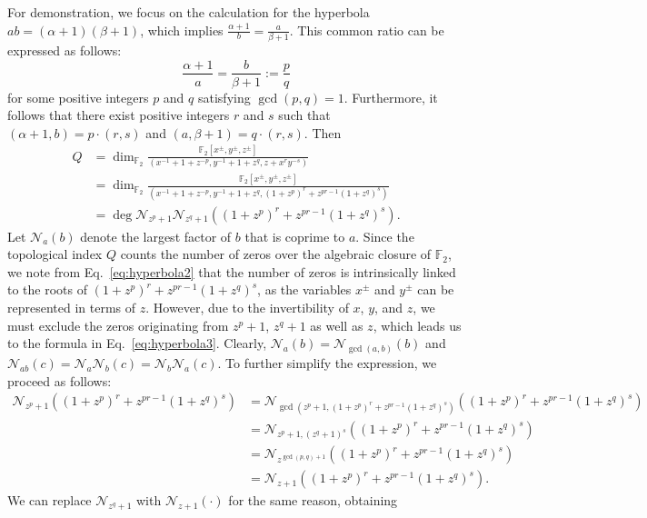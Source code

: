 \documentclass[aps,prl,english,superscriptaddress,twocolumn,tightenlines,showpacs,longbibliography,floatfix,amsfonts]{revtex4-2}
\begin{document}
For demonstration, we focus on the calculation for the hyperbola $ab=(\alpha+1)(\beta+1)$, which implies $\frac{\alpha+1}{b} = \frac{a}{\beta+1}$. This common ratio can be expressed as follows: 
\begin{equation}
	\frac{\alpha+1}{a} = \frac{b}{\beta+1} := \frac{p}{q}
\end{equation}
for some positive integers $p$ and $q$ satisfying $\gcd(p,q) = 1$. Furthermore, it follows that there exist positive integers $r$ and $s$ such that $(\alpha+1,b)=p\cdot(r,s)$ and $(a, \beta+1)=q\cdot(r,s)$. Then
\begin{align}
	Q &= \dim_{\mathbb{F}_2}\frac{\mathbb{F}_2[x^{\pm}, y^{\pm}, z^{\pm}]}{\left(x^{-1}+1+z^{-p}, y^{-1}+1+z^q, z+x^ry^{-s}\right)} \\
	&= \dim_{\mathbb{F}_2}\frac{\mathbb{F}_2[x^{\pm}, y^{\pm}, z^{\pm}]}{\left(x^{-1}+1+z^{-p}, y^{-1}+1+z^q, (1+z^p)^r+z^{pr-1}(1+z^q)^s\right)}\label{eq:hyperbola2} \\
	&= \deg \mathcal{N}_{z^p+1}\mathcal{N}_{z^q+1}\left((1+z^p)^r+z^{pr-1}(1+z^q)^s\right).\label{eq:hyperbola3}
\end{align}
Let $\mathcal{N}_a(b)$ denote the largest factor of $b$ that is coprime to $a$. Since the topological index $Q$ counts the number of zeros over the algebraic closure of $\mathbb{F}_2$, we note from Eq.~\eqref{eq:hyperbola2} that the number of zeros is intrinsically linked to the roots of $(1+z^p)^r+z^{pr-1}(1+z^q)^s$, as the variables $x^\pm$ and $y^\pm$ can be represented in terms of $z$.  However, due to the invertibility of $x$, $y$, and $z$, we must exclude the zeros originating from $z^p+1$, $z^q+1$ as well as $z$, which leads us to the formula in Eq.~\eqref{eq:hyperbola3}. Clearly, $\mathcal{N}_a(b) = \mathcal{N}_{\gcd(a,b)}(b)$ and $\mathcal{N}_{ab}(c)=\mathcal{N}_a\mathcal{N}_b(c)=\mathcal{N}_b\mathcal{N}_a(c)$. To further simplify the expression, we proceed as follows:
\begin{align}
	\mathcal{N}_{z^p+1}\left((1+z^p)^r+z^{pr-1}(1+z^q)^s\right) &= \mathcal{N}_{\gcd(z^p+1, (1+z^p)^r+z^{pr-1}(1+z^q)^s)}\left((1+z^p)^r+z^{pr-1}(1+z^q)^s\right)\\
	&=\mathcal{N}_{z^p+1, (z^q+1)^s}\left((1+z^p)^r+z^{pr-1}(1+z^q)^s\right) \\
	&= \mathcal{N}_{z^{\gcd(p,q)+1}}\left((1+z^p)^r+z^{pr-1}(1+z^q)^s\right) \\
	&= \mathcal{N}_{z+1}\left((1+z^p)^r+z^{pr-1}(1+z^q)^s\right).
\end{align}
We can replace $\mathcal{N}_{z^q+1}$ with $\mathcal{N}_{z+1}(\cdot)$ for the same reason, obtaining
\end{document}
